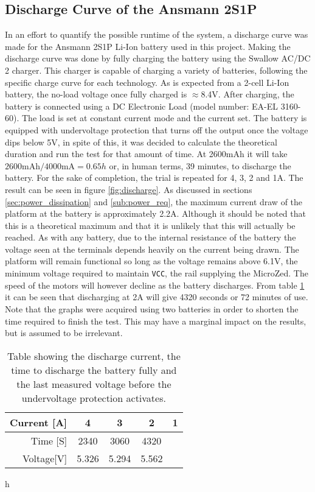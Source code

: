 \subsection{Discharge Curve of the Ansmann 2S1P} %
\label{sub:discharge_curve_of_the_ansmann_2s1p}
In an effort to quantify the possible runtime of the system, a discharge curve was made for the Ansmann 2S1P Li-Ion battery used in this project.
Making the discharge curve was done by fully charging the battery using the Swallow AC/DC 2 charger.
This charger is capable of charging a variety of batteries, following the specific charge curve for each technology.
As is expected from a 2-cell Li-Ion battery, the no-load voltage once fully charged is $\approx$8.4V.
After charging, the battery is connected using a DC Electronic Load (model number: EA-EL 3160-60).
The load is set at constant current mode and the current set.
The battery is equipped with undervoltage protection that turns off the output once the voltage dips below 5V, in spite of this, it was decided to calculate the theoretical duration and run the test for that amount of time.
At 2600mAh it will take $2600\text{mAh}/4000\text{mA}=0.65h$ or, in human terms, 39 minutes, to discharge the battery.
For the sake of completion, the trial is repeated for 4, 3, 2 and 1A.
The result can be seen in figure \ref{fig:discharge}.
As discussed in sections \ref{sec:power_dissipation} and \ref{sub:power_req}, the maximum current draw of the platform at the battery is approximately 2.2A.
Although it should be noted that this is a theoretical maximum and that it is unlikely that this will actually be reached.
As with any battery, due to the internal resistance of the battery the voltage seen at the terminals depends heavily on the current being drawn.
The platform will remain functional so long as the voltage remains above 6.1V, the minimum voltage required to maintain \texttt{VCC}, the rail supplying the MicroZed.
The speed of the motors will however decline as the battery discharges.
From table \ref{tab:discharge} it can be seen that discharging at 2A will give 4320 seconds or 72 minutes of use.
Note that the graphs were acquired using two batteries in order to shorten the time required to finish the test.
This may have a marginal impact on the results, but is assumed to be irrelevant.

\begin{table}[h]
  \centering
  \begin{tabular}{|r|c|c|c|c|}
    \hline
    Current [A] & 4 & 3 & 2 & 1 \\
    \hline
    Time [S] & 2340 & 3060 & 4320 &  \\
    \hline
    Voltage[V] & 5.326 & 5.294 & 5.562 &\\
    \hline
  \end{tabular}
  \caption{Table showing the discharge current, the time to discharge the battery fully and the last measured voltage before the undervoltage protection activates.}
  \label{tab:discharge}
\end{table}h

